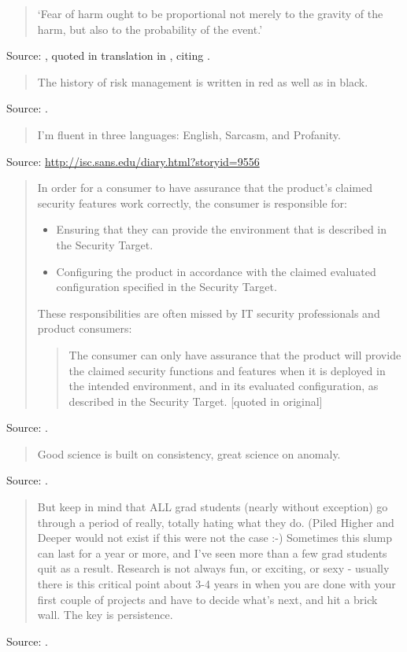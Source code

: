 \documentclass[a4paper]{article}
\begin{document}
\begin{quote}
	`Fear of harm ought to be proportional not merely to the gravity
	of the harm, but also to the probability of the event.'
\end{quote}
Source: \citet{PortRoyal1662}, quoted in translation in
\citet[p.~71]{Bernstein1996}, citing \citet{Hacking1972}.
\medskip

\begin{quote}
	The history of risk management is written in red as well as in black.
\end{quote}
Source: \citet[p.~61]{Bernstein1996}.
\medskip

\begin{quote}
	I'm fluent in three languages: English, Sarcasm, and Profanity.
\end{quote}
Source: \url{http://isc.sans.edu/diary.html?storyid=9556}
\medskip

\begin{quote}
	In order for a consumer to have assurance that the product's
	claimed security features work correctly, the consumer is
	responsible for:
	\begin{itemize}
		\item Ensuring that they can provide the environment that
			is described in the Security Target.
		\item Configuring the product in accordance with the claimed
			evaluated configuration specified in the Security Target.
	\end{itemize}
	These responsibilities are often missed by IT security professionals
	and product consumers:
	\begin{quote}
		The consumer can only have assurance that the product will
		provide the claimed security functions and features when
		it is deployed in the intended environment, and in its
		evaluated configuration, as described in the Security Target.
		[quoted in original]
	\end{quote}
\end{quote}
Source: \citet{Spicer2010}.
\medskip

\begin{quote}
	Good science is built on consistency, great science on anomaly.
\end{quote}
Source: \citet{Kean2010}.
\medskip

\begin{quote}
	But keep in mind that ALL grad students (nearly without exception)
	go through a period of really, totally hating what they do. (Piled
	Higher and Deeper would not exist if this were not the case :-)
	Sometimes this slump can last for a year or more, and I've seen
	more than a few grad students quit as a result. Research is
	not always fun, or exciting, or sexy - usually there is this
	critical point about 3-4 years in when you are done with your
	first couple of projects and have to decide what's next, and
	hit a brick wall. The key is persistence.
\end{quote}
Source: \citet[comments]{Welsh2010a}.
\medskip
\end{document}
